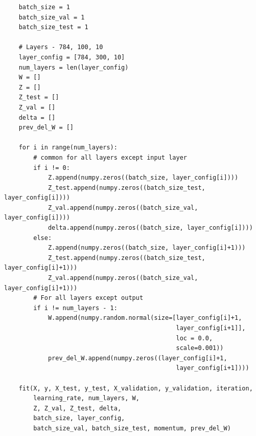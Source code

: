 \documentclass{article}
\begin{document}
\begin{lstlisting}
    batch_size = 1
    batch_size_val = 1
    batch_size_test = 1
    
    # Layers - 784, 100, 10
    layer_config = [784, 300, 10]
    num_layers = len(layer_config)
    W = []
    Z = []
    Z_test = []
    Z_val = []
    delta = []
    prev_del_W = []
        
    for i in range(num_layers): 
        # common for all layers except input layer
        if i != 0:
            Z.append(numpy.zeros((batch_size, layer_config[i])))
            Z_test.append(numpy.zeros((batch_size_test, layer_config[i])))
            Z_val.append(numpy.zeros((batch_size_val, layer_config[i])))
            delta.append(numpy.zeros((batch_size, layer_config[i])))
        else:
            Z.append(numpy.zeros((batch_size, layer_config[i]+1)))
            Z_test.append(numpy.zeros((batch_size_test, layer_config[i]+1)))
            Z_val.append(numpy.zeros((batch_size_val, layer_config[i]+1)))
        # For all layers except output
        if i != num_layers - 1:
            W.append(numpy.random.normal(size=[layer_config[i]+1, 
                                               layer_config[i+1]], 
                                               loc = 0.0, 
                                               scale=0.001))
            prev_del_W.append(numpy.zeros((layer_config[i]+1, 
                                               layer_config[i+1])))
                                               
    fit(X, y, X_test, y_test, X_validation, y_validation, iteration, 
        learning_rate, num_layers, W, 
        Z, Z_val, Z_test, delta,  
        batch_size, layer_config,
        batch_size_val, batch_size_test, momentum, prev_del_W)
\end{lstlisting}
\end{document}
